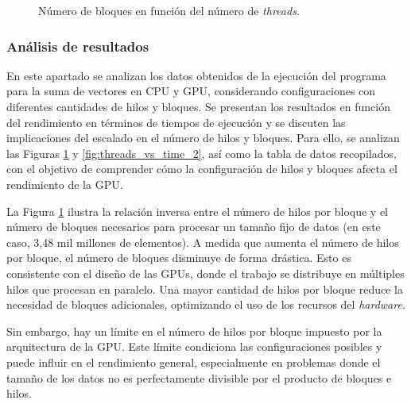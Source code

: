 \documentclass{article}
\begin{document}
			\begin{figure}
				\centering
				\caption{Número de bloques en función del número de \textit{threads}.}
				\label{fig:threads_vs_blocks_2}
			\end{figure}

		\subsubsection{Análisis de resultados}

			En este apartado se analizan los datos obtenidos de la ejecución del programa para la suma de vectores en CPU y GPU, considerando configuraciones con diferentes cantidades de hilos y bloques. Se presentan los resultados en función del rendimiento en términos de tiempos de ejecución y se discuten las implicaciones del escalado en el número de hilos y bloques. Para ello, se analizan las Figuras \ref{fig:threads_vs_blocks_2} y \ref{fig:threads_vs_time_2}, así como la tabla de datos recopilados, con el objetivo de comprender cómo la configuración de hilos y bloques afecta el rendimiento de la GPU.

			La Figura \ref{fig:threads_vs_blocks_2} ilustra la relación inversa entre el número de hilos por bloque y el número de bloques necesarios para procesar un tamaño fijo de datos (en este caso, 3,48 mil millones de elementos). A medida que aumenta el número de hilos por bloque, el número de bloques disminuye de forma drástica. Esto es consistente con el diseño de las GPUs, donde el trabajo se distribuye en múltiples hilos que procesan en paralelo. Una mayor cantidad de hilos por bloque reduce la necesidad de bloques adicionales, optimizando el uso de los recursos del \textit{hardware}.

			Sin embargo, hay un límite en el número de hilos por bloque impuesto por la arquitectura de la GPU. Este límite condiciona las configuraciones posibles y puede influir en el rendimiento general, especialmente en problemas donde el tamaño de los datos no es perfectamente divisible por el producto de bloques e hilos.
\end{document}
